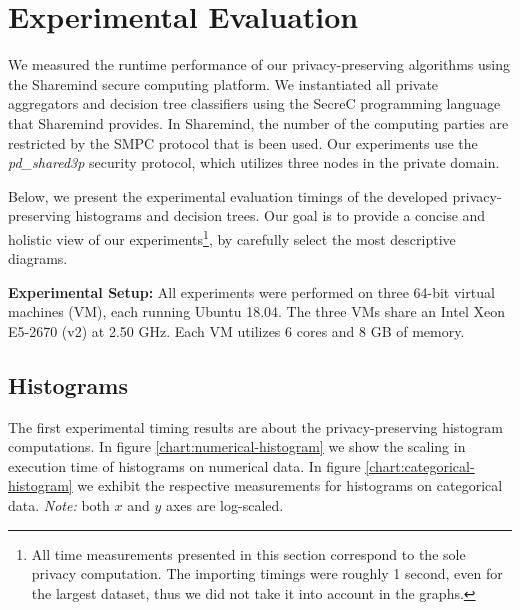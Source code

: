 \chapter{Experimental Evaluation}\label{c:evaluations}



We measured the runtime performance of our privacy\hyp preserving algorithms using the Sharemind secure computing platform.
We instantiated all private aggregators and decision tree classifiers using the SecreC programming language \cite{jagomagis2010secrec} that Sharemind provides.
In Sharemind, the number of the computing parties are restricted by the SMPC protocol that is been used.
Our experiments use the \textit{pd\_shared3p} security protocol, which utilizes three nodes in the private domain.


Below, we present the experimental evaluation timings of the developed privacy\hyp preserving histograms and decision trees.
Our goal is to provide a concise and holistic view of our experiments\footnote{All time measurements presented in this section correspond to the sole privacy computation. The importing timings were roughly 1 second, even for the largest dataset, thus we did not take it into account in the graphs.}, by carefully select the most descriptive diagrams.


\textbf{Experimental Setup:}
All experiments were performed on three 64-bit virtual machines (VM), each running Ubuntu 18.04.
The three VMs share an Intel Xeon E5-2670 (v2) at 2.50 GHz.
Each VM utilizes 6 cores and 8 GB of memory.


\section{Histograms}\label{s:results-histograms}

The first experimental timing results are about the privacy\hyp preserving histogram computations.
In figure \ref{chart:numerical-histogram} we show the scaling in execution time of histograms on numerical data.
In figure \ref{chart:categorical-histogram} we exhibit the respective measurements for histograms on categorical data.
\textit{Note:} both $x$ and $y$ axes are log\hyp scaled.


